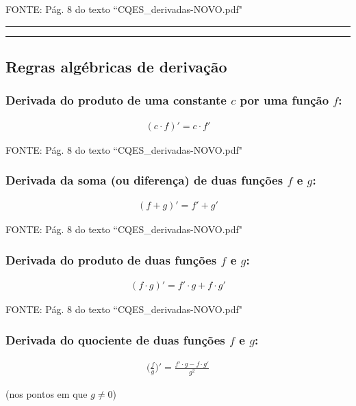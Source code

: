 \documentclass[portuguese,a4paper,12pt,onecolumn,fleqn]{article}
\newcommand{\myline}{\par
  \kern3pt %
  \hrule height 1.5pt
  \kern2pt %
  \hrule height 0.8pt
  \kern3pt %
}
\begin{document}
FONTE: Pág. 8 do texto ``CQES\_derivadas-NOVO.pdf"


\myline	%


\subsection*{Regras algébricas de derivação}

\subsubsection*{Derivada do produto de uma constante $c$ por uma função $f$:}

\begin{gather*}
(c \cdot f)' = c \cdot f'
\end{gather*}

FONTE: Pág. 8 do texto ``CQES\_derivadas-NOVO.pdf"


\subsubsection*{Derivada da soma (ou diferença) de duas funções $f$ e $g$:}

\begin{gather*}
(f + g)' = f' + g'
\end{gather*}

FONTE: Pág. 8 do texto ``CQES\_derivadas-NOVO.pdf"


\subsubsection*{Derivada do produto de duas funções $f$ e $g$:}

\begin{gather*}
(f \cdot g)' = f' \cdot g + f \cdot g'
\end{gather*}

FONTE: Pág. 8 do texto ``CQES\_derivadas-NOVO.pdf"


\subsubsection*{Derivada do quociente de duas funções $f$ e $g$:}

\begin{gather*}
\biggl(\frac{f}{g}\biggr)' = \frac{f' \cdot g - f \cdot g'}{g^2}
\end{gather*}

(nos pontos em que $g \ne 0$)
\end{document}
